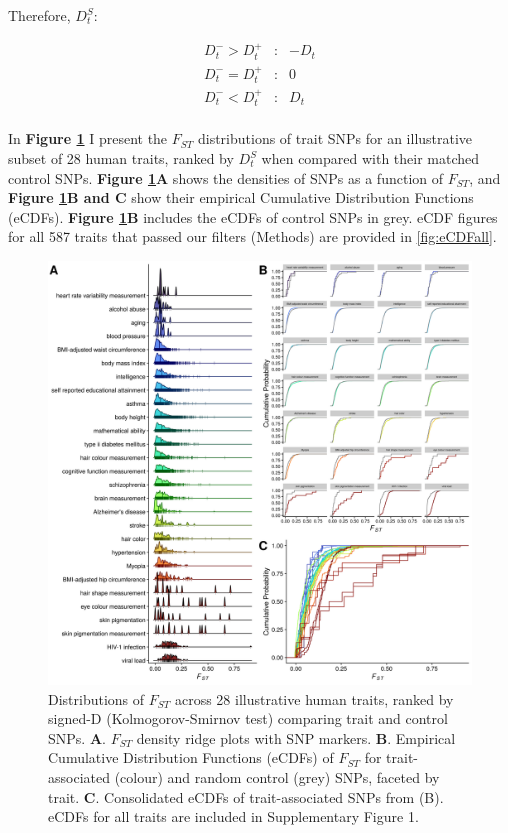 \documentclass[
]{book}
\begin{document}
Therefore, \({D_t^S}\):

\[
\begin{aligned}
D_t^- > D_t^+ &: &-D_t \\
D_t^- = D_t^+ &: &0 \\
D_t^- < D_t^+ &: &D_t \\
\end{aligned}
\]

In \textbf{Figure \ref{fig:FstMain}} I present the \(F_{ST}\) distributions of trait SNPs for an illustrative subset of 28 human traits, ranked by \({D_t^S}\) when compared with their matched control SNPs. \textbf{Figure \ref{fig:FstMain}A} shows the densities of SNPs as a function of \(F_{ST}\), and \textbf{Figure \ref{fig:FstMain}B and C} show their empirical Cumulative Distribution Functions (eCDFs). \textbf{Figure \ref{fig:FstMain}B} includes the eCDFs of control SNPs in grey. eCDF figures for all 587 traits that passed our filters (Methods) are provided in \ref{fig:eCDFall}.



\begin{figure}
\includegraphics[width=1\linewidth]{figs/fst/0.1_1000_20220314_final} \caption{Distributions of \(F_{ST}\) across 28 illustrative human traits, ranked by signed-D (Kolmogorov-Smirnov test) comparing trait and control SNPs. \textbf{A}. \(F_{ST}\) density ridge plots with SNP markers. \textbf{B}. Empirical Cumulative Distribution Functions (eCDFs) of \(F_{ST}\) for trait-associated (colour) and random control (grey) SNPs, faceted by trait. \textbf{C}. Consolidated eCDFs of trait-associated SNPs from (B). eCDFs for all traits are included in Supplementary Figure 1.}\label{fig:FstMain}
\end{figure}
\end{document}
